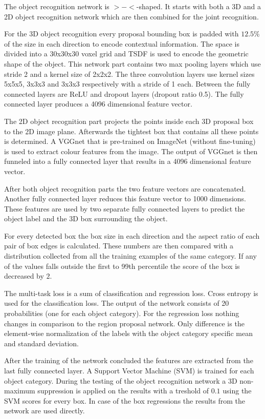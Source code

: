 \documentclass[12pt]{scrartcl}
\begin{document}
The object recognition network is \(>-<\)-shaped. It starts with both a 3D and a 2D
object recognition network which are then combined for the joint recognition.

For the 3D object recognition every proposal bounding box is padded with \(12.5\%\)
of the size in each direction to encode contextual information. The space is divided
into a 30x30x30 voxel grid and TSDF is used to encode the geometric shape of
the object. This network part contains two max pooling layers which use stride 2
and a kernel size of 2x2x2. The three convolution layers use kernel sizes
5x5x5, 3x3x3 and 3x3x3 respectively with a stride of 1 each. Between the fully connected
layers are ReLU and dropout layers (dropout ratio 0.5). The fully connected
layer produces a 4096 dimensional feature vector.

The 2D object recognition part projects the points inside each 3D proposal box
to the 2D image plane. Afterwards the tightest box that contains all these points
is determined. A VGGnet that is pre-trained on ImageNet (without fine-tuning)
is used to extract colour features from the image. The output of VGGnet is then
funneled into a fully connected layer that results in a 4096 dimensional feature
vector.

After both object recognition parts the two feature vectors are concatenated.
Another fully connected layer reduces this feature vector to 1000 dimensions.
These features are used by two separate fully connected layers to predict the
object label and the 3D box surrounding the object.

For every detected box the box size in each direction and the aspect ratio of
each pair of box edges is calculated. These numbers are then compared with a
distribution collected from all the training examples of the same category.
If any of the values falls outside the first to 99th percentile the score
of the box is decreased by \(2\).

The multi-task loss is a sum of classification and regression loss. Cross entropy
is used for the classification loss. The output of the network consists of 20
probabilities (one for each object category). For the regression loss nothing
changes in comparison to the region proposal network. Only difference is the
element-wise normalization of the labels with the object category specific
mean and standard deviation.

After the training of the network concluded the features are extracted from the last
fully connected layer. A Support Vector Machine (SVM) is trained for each object
category. During the testing of the object recognition network a 3D non-maximum
suppression is applied on the results with a treshold of \(0.1\) using the SVM
scores for every box. In case of the box regressions the results from the network
are used directly.
\end{document}
